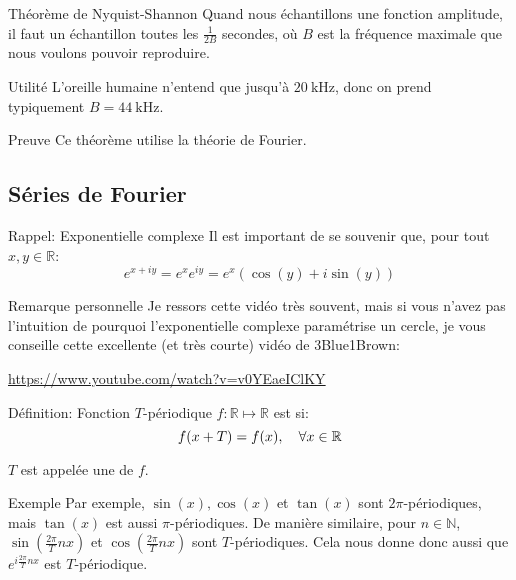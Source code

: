 \documentclass[a4paper]{article}
\begin{document}
\begin{parag}{Théorème de Nyquist-Shannon}
    Quand nous échantillons une fonction amplitude, il faut un échantillon toutes les  $\frac{1}{2B}$ secondes, où $B$ est la fréquence maximale que nous voulons pouvoir reproduire.

    \begin{subparag}{Utilité}
        L'oreille humaine n'entend que jusqu'à $\SI{20}{\kilo\hertz }$, donc on prend typiquement $B = \SI{44}{\kilo\hertz }$.
    \end{subparag}
    
    \begin{subparag}{Preuve}
        Ce théorème utilise la théorie de Fourier.
    \end{subparag}
\end{parag}

\subsection{Séries de Fourier}
\begin{parag}{Rappel: Exponentielle complexe}
    Il est important de se souvenir que, pour tout $x, y \in \mathbb{R}$: 
    \[e^{x + iy} = e^{x} e^{iy} = e^{x} \left(\cos\left(y\right) + i\sin\left(y\right)\right)\]

    \begin{subparag}{Remarque personnelle}
        Je ressors cette vidéo très souvent, mais si vous n'avez pas l'intuition de pourquoi l'exponentielle complexe paramétrise un cercle, je vous conseille cette excellente (et très courte) vidéo de 3Blue1Brown:
        \begin{center}
            \url{https://www.youtube.com/watch?v=v0YEaeIClKY}
        \end{center}
    \end{subparag}
\end{parag}


\begin{parag}{Définition: Fonction $T$-périodique}
    $f: \mathbb{R} \mapsto \mathbb{R}$ est  si: 
    \[f\left(x + T\right) = f\left(x\right), \mathspace \forall x \in \mathbb{R}\]
    
    $T$ est appelée une  de $f$.

    \begin{subparag}{Exemple}
        Par exemple, $\sin\left(x\right), \cos\left(x\right)$ et $\tan\left(x\right)$ sont $2\pi$-périodiques, mais $\tan\left(x\right)$ est aussi $\pi$-périodiques. De manière similaire, pour $n \in \mathbb{N}$, $\sin\left(\frac{2\pi}{T} nx\right)$ et $\cos\left(\frac{2\pi}{T} nx\right)$ sont $T$-périodiques. Cela nous donne donc aussi que $e^{i\frac{2\pi}{T}nx}$ est $T$-périodique.
    \end{subparag}
\end{parag}
\end{document}
